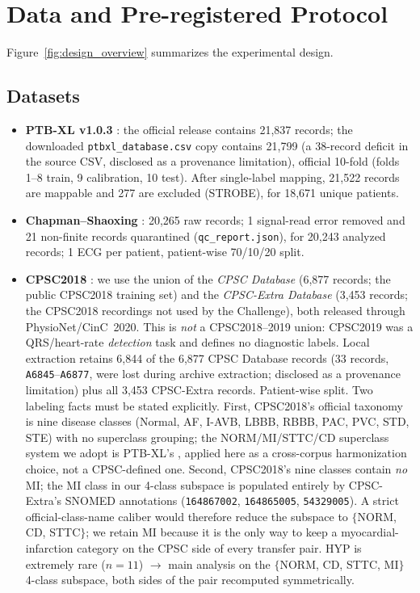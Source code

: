 \documentclass[final,5p,times,nonatbib]{elsarticle}
\begin{document}
\section{Data and Pre-registered Protocol}
\label{sec:data}
Figure~\ref{fig:design_overview} summarizes the experimental design.
\subsection{Datasets}
\begin{itemize}
    \item \textbf{PTB-XL v1.0.3} \cite{wagner2020ptbxl}: the official release contains 21,837
    records; the downloaded \texttt{ptbxl\_database.csv} copy contains 21,799
    (a 38-record deficit in the source CSV, disclosed as a provenance
    limitation), official 10-fold
    (folds 1--8 train, 9 calibration, 10 test). After
    single-label mapping, 21,522 records are mappable and 277 are
    excluded (STROBE), for 18,671 unique patients.
    \item \textbf{Chapman--Shaoxing} \cite{zheng2022ecgarrhythmia,goldberger2000}: 20,265
    raw records; 1 signal-read error removed and 21 non-finite records
    quarantined (\texttt{qc\_report.json}), for 20,243 analyzed records;
    1 ECG per patient, patient-wise 70/10/20 split.
    \item \textbf{CPSC2018} \cite{liu2018cpsc,physionet2020cpsc}: we use the union
    of the \emph{CPSC Database} (6,877 records; the public CPSC2018 training
    set) and the \emph{CPSC-Extra Database} (3,453 records; the CPSC2018
    recordings not used by the Challenge), both released through
    PhysioNet/CinC~2020. This is \emph{not} a CPSC2018--2019 union: CPSC2019
    was a QRS/heart-rate \emph{detection} task and defines no diagnostic
    labels. Local extraction retains 6,844 of the 6,877 CPSC Database records
    (33 records, \texttt{A6845}--\texttt{A6877}, were lost during archive
    extraction; disclosed as a provenance limitation) plus all 3,453
    CPSC-Extra records. Patient-wise split. Two labeling facts must be stated
    explicitly. First, CPSC2018's official taxonomy is nine disease classes
    (Normal, AF, I-AVB, LBBB, RBBB, PAC, PVC, STD, STE) with no superclass
    grouping; the NORM\slash MI\slash STTC\slash CD superclass system we adopt
    is PTB-XL's \cite{wagner2020ptbxl}, applied here as a cross-corpus
    harmonization choice, not a CPSC-defined one. Second, CPSC2018's nine
    classes contain \emph{no} MI; the MI class in our 4-class subspace is
    populated entirely by CPSC-Extra's SNOMED annotations (\texttt{164867002},
    \texttt{164865005}, \texttt{54329005}). A strict official-class-name
    caliber would therefore reduce the subspace to $\{$NORM, CD, STTC$\}$; we
    retain MI because it is the only way to keep a myocardial-infarction
    category on the CPSC side of every transfer pair. HYP is extremely rare
    ($n=11$) $\rightarrow$ main analysis on the $\{$NORM, CD, STTC, MI$\}$
    4-class subspace, both sides of the pair recomputed symmetrically.
\end{itemize}
\end{document}

